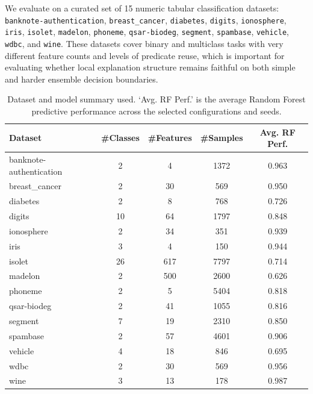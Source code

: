 \documentclass[runningheads]{llncs}
\begin{document}
We evaluate on a curated set of 15 numeric tabular classification datasets:
\texttt{banknote-authentication}, \texttt{breast\_cancer}, \texttt{diabetes},
\texttt{digits}, \texttt{ionosphere}, \texttt{iris}, \texttt{isolet},
\texttt{madelon}, \texttt{phoneme}, \texttt{qsar-biodeg}, \texttt{segment},
\texttt{spambase}, \texttt{vehicle}, \texttt{wdbc}, and \texttt{wine}.
These datasets cover binary and multiclass tasks with very different feature counts and levels of predicate reuse, which is important for evaluating whether local explanation structure remains faithful on both simple and harder ensemble decision boundaries.

\begin{table}[h!]
  \centering
  \small
  \caption{Dataset and model summary used. `Avg. RF Perf.' is the average Random Forest predictive performance across the selected configurations and seeds.}
  \label{tab:datasets-models-summary}
  \begin{tabular}{lcccc}
    \toprule
    Dataset & \#Classes & \#Features & \#Samples & Avg. RF Perf. \\
    \midrule
    banknote-authentication & 2 & 4 & 1372 & 0.963 \\
    breast\_cancer & 2 & 30 & 569 & 0.950 \\
    diabetes & 2 & 8 & 768 & 0.726 \\
    digits & 10 & 64 & 1797 & 0.848 \\
    ionosphere & 2 & 34 & 351 & 0.939 \\
    iris & 3 & 4 & 150 & 0.944 \\
    isolet & 26 & 617 & 7797 & 0.714 \\
    madelon & 2 & 500 & 2600 & 0.626 \\
    phoneme & 2 & 5 & 5404 & 0.818 \\
    qsar-biodeg & 2 & 41 & 1055 & 0.816 \\
    segment & 7 & 19 & 2310 & 0.850 \\
    spambase & 2 & 57 & 4601 & 0.906 \\
    vehicle & 4 & 18 & 846 & 0.695 \\
    wdbc & 2 & 30 & 569 & 0.956 \\
    wine & 3 & 13 & 178 & 0.987 \\
    \bottomrule
  \end{tabular}
\end{table}
\end{document}
